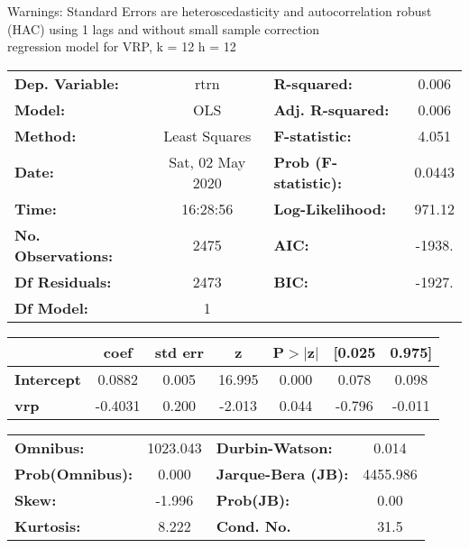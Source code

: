 Warnings: \newline
 [1] Standard Errors are heteroscedasticity and autocorrelation robust (HAC) using 1 lags and without small sample correction\\ 

regression model for VRP, k = 12 h = 12\begin{center}
\begin{tabular}{lclc}
\toprule
\textbf{Dep. Variable:}    &       rtrn       & \textbf{  R-squared:         } &     0.006   \\
\textbf{Model:}            &       OLS        & \textbf{  Adj. R-squared:    } &     0.006   \\
\textbf{Method:}           &  Least Squares   & \textbf{  F-statistic:       } &     4.051   \\
\textbf{Date:}             & Sat, 02 May 2020 & \textbf{  Prob (F-statistic):} &   0.0443    \\
\textbf{Time:}             &     16:28:56     & \textbf{  Log-Likelihood:    } &    971.12   \\
\textbf{No. Observations:} &        2475      & \textbf{  AIC:               } &    -1938.   \\
\textbf{Df Residuals:}     &        2473      & \textbf{  BIC:               } &    -1927.   \\
\textbf{Df Model:}         &           1      & \textbf{                     } &             \\
\bottomrule
\end{tabular}
\begin{tabular}{lcccccc}
                   & \textbf{coef} & \textbf{std err} & \textbf{z} & \textbf{P$> |$z$|$} & \textbf{[0.025} & \textbf{0.975]}  \\
\midrule
\textbf{Intercept} &       0.0882  &        0.005     &    16.995  &         0.000        &        0.078    &        0.098     \\
\textbf{vrp}       &      -0.4031  &        0.200     &    -2.013  &         0.044        &       -0.796    &       -0.011     \\
\bottomrule
\end{tabular}
\begin{tabular}{lclc}
\textbf{Omnibus:}       & 1023.043 & \textbf{  Durbin-Watson:     } &    0.014  \\
\textbf{Prob(Omnibus):} &   0.000  & \textbf{  Jarque-Bera (JB):  } & 4455.986  \\
\textbf{Skew:}          &  -1.996  & \textbf{  Prob(JB):          } &     0.00  \\
\textbf{Kurtosis:}      &   8.222  & \textbf{  Cond. No.          } &     31.5  \\
\bottomrule
\end{tabular}
\end{center}

